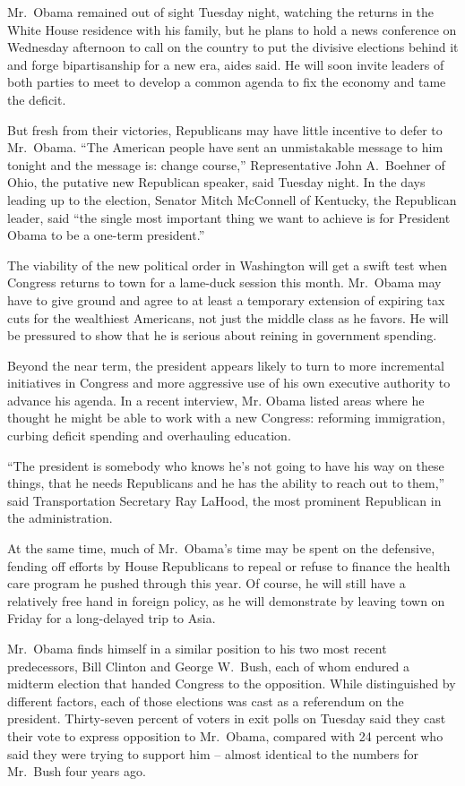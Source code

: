 ﻿\documentclass[12pt]{article}
\begin{document}
Mr.~Obama remained out of sight Tuesday night, watching the returns in the White House residence
with his family, but he plans to hold a news conference on Wednesday afternoon to call on the
country to put the divisive elections behind it and forge bipartisanship for a new era, aides said.
He will soon invite leaders of both parties to meet to develop a common agenda to fix the economy
and tame the deficit.

But fresh from their victories, Republicans may have little incentive to defer to Mr.~Obama. ``The
American people have sent an unmistakable message to him tonight and the message is: change
course,'' Representative John A.~Boehner of Ohio, the putative new Republican speaker, said Tuesday
night. In the days leading up to the election, Senator Mitch McConnell of Kentucky, the Republican
leader, said ``the single most important thing we want to achieve is for President Obama to be a
one-term president.''

The viability of the new political order in Washington will get a swift test when Congress returns
to town for a lame-duck session this month. Mr.~Obama may have to give ground and agree to at least
a temporary extension of expiring tax cuts for the wealthiest Americans, not just the middle class
as he favors. He will be pressured to show that he is serious about reining in government spending.

Beyond the near term, the president appears likely to turn to more incremental initiatives in
Congress and more aggressive use of his own executive authority to advance his agenda. In a recent
interview, Mr. Obama listed areas where he thought he might be able to work with a new Congress:
reforming immigration, curbing deficit spending and overhauling education.

``The president is somebody who knows he's not going to have his way on these things, that he needs
Republicans and he has the ability to reach out to them,'' said Transportation Secretary Ray LaHood,
the most prominent Republican in the administration.

At the same time, much of Mr.~Obama's time may be spent on the defensive, fending off efforts by
House Republicans to repeal or refuse to finance the health care program he pushed through this
year. Of course, he will still have a relatively free hand in foreign policy, as he will demonstrate
by leaving town on Friday for a long-delayed trip to Asia.

Mr.~Obama finds himself in a similar position to his two most recent predecessors, Bill Clinton and
George W.~Bush, each of whom endured a midterm election that handed Congress to the opposition.
While distinguished by different factors, each of those elections was cast as a referendum on the
president. Thirty-seven percent of voters in exit polls on Tuesday said they cast their vote to
express opposition to Mr.~Obama, compared with 24 percent who said they were trying to support him
-- almost identical to the numbers for Mr.~Bush four years ago.
\end{document}
